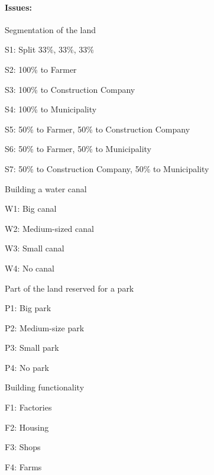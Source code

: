 \documentclass[a4,11pt]{scrartcl}
\let\tempone\itemize
\let\temptwo\enditemize
\renewenvironment{itemize}{\tempone\addtolength{\itemsep}{-0.5\baselineskip}}{\temptwo}
\begin{document}
    \paragraph{Issues:}
    \begin{itemize}
        \item Segmentation of the land
        \begin{itemize}
            \item S1: Split 33\%, 33\%, 33\%
            \item S2: 100\% to Farmer
            \item S3: 100\% to Construction Company
            \item S4: 100\% to Municipality
            \item S5: 50\% to Farmer, 50\% to Construction Company
            \item S6: 50\% to Farmer, 50\% to Municipality
            \item S7: 50\% to Construction Company, 50\% to Municipality
        \end{itemize}
        \item Building a water canal
        \begin{itemize}
            \item W1: Big canal
            \item W2: Medium-sized canal
            \item W3: Small canal
            \item W4: No canal
        \end{itemize}
        \item Part of the land reserved for a park
        \begin{itemize}
            \item P1: Big park
            \item P2: Medium-size park
            \item P3: Small park
            \item P4: No park
        \end{itemize}
        \item Building functionality
        \begin{itemize}
            \item F1: Factories
            \item F2: Housing
            \item F3: Shops
            \item F4: Farms
        \end{itemize}
    \end{itemize}
    
\end{document}
